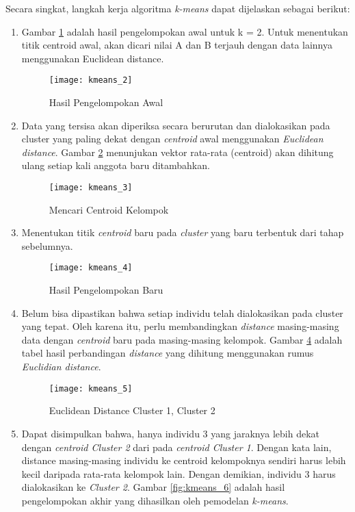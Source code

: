 \noindent Secara singkat, langkah kerja algoritma \textit{k-means} dapat dijelaskan sebagai berikut:
\begin{enumerate}

\item Gambar \ref{fig:kmeans_2} adalah hasil pengelompokan awal untuk k = 2. Untuk menentukan titik centroid awal, akan dicari nilai A dan B terjauh dengan data lainnya menggunakan Euclidean distance.

\begin{figure}[H]
	\centering
	\texttt{[image: kmeans\_2]}
	\caption{Hasil Pengelompokan Awal}
	\label{fig:kmeans_2}
\end{figure}

\item Data yang tersisa akan diperiksa secara berurutan dan dialokasikan pada cluster yang paling dekat dengan \textit{centroid} awal menggunakan \textit{Euclidean distance}. Gambar \ref{fig:kmeans_3} menunjukan vektor rata-rata (centroid) akan dihitung ulang setiap kali anggota baru ditambahkan.

\begin{figure}[H]
	\centering
	\texttt{[image: kmeans\_3]}
	\caption{Mencari Centroid Kelompok}
	\label{fig:kmeans_3}
\end{figure}

\item Menentukan titik \textit{centroid} baru pada \textit{cluster} yang baru terbentuk dari tahap sebelumnya.

\begin{figure}[H]
	\centering
	\texttt{[image: kmeans\_4]}
	\caption{Hasil Pengelompokan Baru}
	\label{fig:kmeans_4}
\end{figure}

\item Belum bisa dipastikan bahwa setiap individu telah dialokasikan pada cluster yang tepat. Oleh karena itu, perlu membandingkan \textit{distance} masing-masing data dengan \textit{centroid} baru pada masing-masing kelompok. Gambar \ref{fig:kmeans_5} adalah tabel hasil perbandingan \textit{distance} yang dihitung menggunakan rumus \textit{Euclidian distance}.

\begin{figure}[H]
	\centering
	\texttt{[image: kmeans\_5]}
	\caption{Euclidean Distance Cluster 1, Cluster 2}
	\label{fig:kmeans_5}
\end{figure}

\item Dapat disimpulkan bahwa, hanya individu 3 yang jaraknya lebih dekat dengan \textit{centroid Cluster 2} dari pada \textit{centroid Cluster 1}. Dengan kata lain, distance masing-masing individu ke centroid kelompoknya sendiri harus lebih kecil daripada rata-rata kelompok lain. Dengan demikian, individu 3 harus dialokasikan ke \textit{Cluster 2}. Gambar \ref{fig:kmeans_6} adalah hasil pengelompokan akhir yang dihasilkan oleh pemodelan \textit{k-means}.


\end{enumerate}
